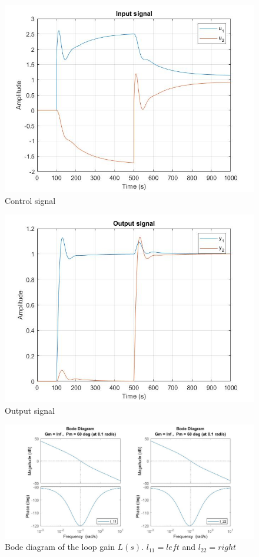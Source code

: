 \documentclass[a4paper,11pt]{article}
\begin{document}
    \begin{figure}[H]
        \centering
        \includegraphics[width=0.8\linewidth]{minphase_simulink_u.jpg}
        \caption{Control signal}
        \label{f1}
    \end{figure}
    \begin{figure}[H]
        \centering
        \includegraphics[width=0.8\linewidth]{minphase_simulink_y.JPG}
        \caption{Output signal}
        \label{f2}
    \end{figure}
    \begin{figure}[H]
        \centering
        \includegraphics[width=1\linewidth]{minphase_L.jpg}
        \caption{Bode diagram of the loop gain $L(s)$. $l_{11}= left$ and $l_{22}=right$}
        \label{f3}
    \end{figure}
    
\end{document}
